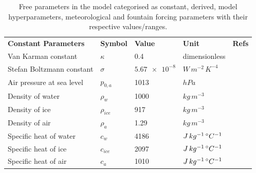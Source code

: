 \begin{table}
	\caption{Free parameters in the model categorised as constant, derived, model hyperparameters, meteorological and
		fountain forcing parameters with their respective values/ranges.}
	\label{tab:parameters}
	\begin{tabular}{lllll}
		\toprule
		\textbf{Constant Parameters}         & \textbf{Symbol}  & \textbf{Value}                      &
		\textbf{Unit}                        & \textbf{Refs}                                                                                                                                   \\
		Van Karman constant                  & $\kappa$         & 0.4                                 & dimensionless                 & \cite{cuffeyPhysicsGlaciers2010}                       \\
		Stefan Boltzmann constant            & $\sigma$         & $\num{5.67 e-8} $                   & $W\, m^{-2}\, K^{-4}$         & \cite{cuffeyPhysicsGlaciers2010}                       \\
		Air pressure at sea level            & $p_{0,a}$        & 1013                                & $hPa$                         & \cite{molgAblationAssociatedEnergy2004}                \\
		Density of water                     & $\rho_{w}$       & 1000                                & $kg\, m^{-3}$                 & \cite{cuffeyPhysicsGlaciers2010}                       \\
		Density of ice                       & $\rho_{ice}$     & 917                                 & $kg\, m^{-3}$                 & \cite{cuffeyPhysicsGlaciers2010}                       \\
		Density of air                       & $\rho_{a}$       & 1.29                                & $kg\, m^{-3}$                 & \cite{molgAblationAssociatedEnergy2004}                \\
		Specific heat of water               & $c_{w}$          & 4186                                & $J\, kg^{-1}\,^{\circ} C^{-1}$ & \cite{cuffeyPhysicsGlaciers2010}                       \\
		Specific heat of ice                 & $c_{ice}$        & 2097                                & $J\, kg^{-1}\,^{\circ} C^{-1}$ & \cite{cuffeyPhysicsGlaciers2010}                       \\
		Specific heat of air                 & $c_{a}$          & 1010                                & $J\, kg^{-1}\,^{\circ} C^{-1}$ &

\end{tabular}
\end{table}
